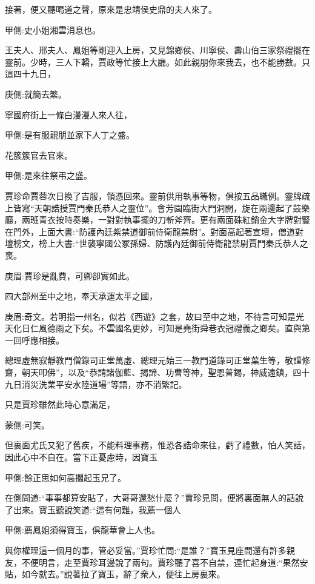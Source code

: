 \begin{parag}
    接著，便又聽喝道之聲，原來是忠靖侯史鼎的夫人來了。\begin{note}甲側:史小姐湘雲消息也。\end{note}王夫人、邢夫人、鳳姐等剛迎入上房，又見錦鄉侯、川寧侯、壽山伯三家祭禮擺在靈前。少時，三人下轎，賈政等忙接上大廳。如此親朋你來我去，也不能勝數。只這四十九日，\begin{note}庚側:就簡去繁。\end{note}寧國府街上一條白漫漫人來人往，\begin{note}甲側:是有服親朋並家下人丁之盛。\end{note}花簇簇官去官來。\begin{note}甲側:是來往祭弔之盛。\end{note}
\end{parag}


\begin{parag}
    賈珍命賈蓉次日換了吉服，領憑回來。靈前供用執事等物，俱按五品職例。靈牌疏上皆寫“天朝誥授賈門秦氏恭人之靈位”。會芳園臨街大門洞開，旋在兩邊起了鼓樂廳，兩班青衣按時奏樂，一對對執事擺的刀斬斧齊。更有兩面硃紅銷金大字牌對豎在門外，上面大書:“防護內廷紫禁道御前侍衛龍禁尉”。對面高起著宣壇，僧道對壇榜文，榜上大書:“世襲寧國公冢孫婦、防護內廷御前侍衛龍禁尉賈門秦氏恭人之喪。\begin{note}庚眉:賈珍是亂費，可卿卻實如此。\end{note}四大部州至中之地，奉天承運太平之國，\begin{note}庚眉:奇文。若明指一州名，似若《西遊》之套，故曰至中之地，不待言可知是光天化日仁風德雨之下矣。不雲國名更妙，可知是堯街舜巷衣冠禮義之鄉矣。直與第一回呼應相接。\end{note}總理虛無寂靜教門僧錄司正堂萬虛、總理元始三一教門道錄司正堂葉生等，敬謹修齋，朝天叩佛”，以及“恭請諸伽藍、揭諦、功曹等神，聖恩普錫，神威遠鎮，四十九日消災洗業平安水陸道場”等語，亦不消繁記。
\end{parag}


\begin{parag}
    只是賈珍雖然此時心意滿足，\begin{note}蒙側:可笑。\end{note}但裏面尤氏又犯了舊疾，不能料理事務，惟恐各誥命來往，虧了禮數，怕人笑話，因此心中不自在。當下正憂慮時，因寶玉\begin{note}甲側:餘正思如何高擱起玉兄了。\end{note}在側問道:“事事都算安貼了，大哥哥還愁什麼？”賈珍見問，便將裏面無人的話說了出來。寶玉聽說笑道:“這有何難，我薦一個人\begin{note}甲側:薦鳳姐須得寶玉，俱龍華會上人也。\end{note}與你權理這一個月的事，管必妥當。”賈珍忙問:“是誰？”寶玉見座間還有許多親友，不便明言，走至賈珍耳邊說了兩句。賈珍聽了喜不自禁，連忙起身道:“果然安貼，如今就去。”說著拉了寶玉，辭了衆人，便往上房裏來。
\end{parag}


